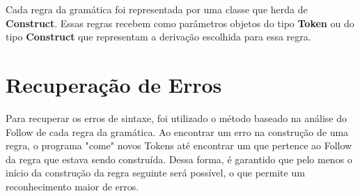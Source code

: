 Cada regra da gramática foi representada por uma classe que herda de \textbf{Construct}.
Essas regras recebem como parâmetros objetos do tipo \textbf{Token} ou do tipo \textbf{Construct} que representam a derivação escolhida para essa regra. 

\section{Recuperação de Erros}
Para recuperar os erros de sintaxe, foi utilizado o método baseado na análise do Follow de cada regra da gramática.
Ao encontrar um erro na construção de uma regra, o programa "come"  novos Tokens até encontrar um que pertence ao Follow da regra que estava sendo construída.
Dessa forma, é garantido que pelo menos o início da construção da regra seguinte será possível, o que permite um reconhecimento maior de erros.
